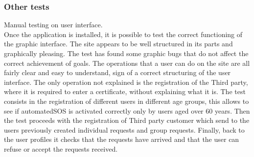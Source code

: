 \subsubsection{Other tests}
Manual testing on user interface.
\\
Once the application is installed, it is possible to test the correct functioning of the graphic interface. The site appears to be well structured in its parts and graphically pleasing. The test has found some graphic bugs
that do not affect the correct achievement of goals. The operations that a user can do on the site are all fairly clear and easy to understand, sign of a correct structuring of the user interface.
The only operation not explained is the registration of the Third party, where it is required to enter a certificate, without explaining what it is.
The test consists in the registration of different users in different age groups, this allows to see if automatedSOS is activated correctly only by users aged over 60 years. Then the test proceeds with the registration of Third party customer which send to the users previously created individual requests and group requests. Finally, back to the user profiles it checks that the requests have arrived and that the user can refuse or accept the requests received.